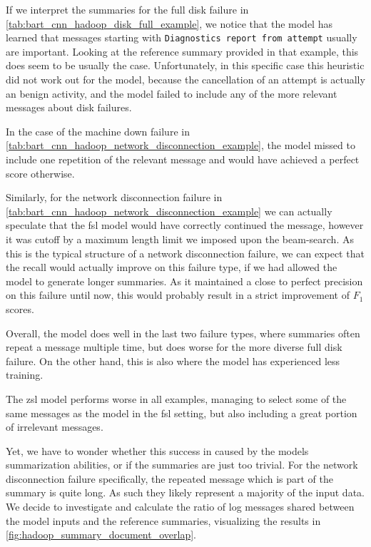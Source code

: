 If we interpret the summaries for the full disk failure in \autoref{tab:bart_cnn_hadoop_disk_full_example},
we notice that the model has learned that messages starting with \verb+Diagnostics report from attempt+ usually are important.
Looking at the reference summary provided in that example, this does seem to be usually the case.
Unfortunately, in this specific case this heuristic did not work out for the model,
because the cancellation of an attempt is actually an benign activity,
and the model failed to include any of the more relevant messages about disk failures.

In the case of the machine down failure in \autoref{tab:bart_cnn_hadoop_network_disconnection_example},
the model missed to include one repetition of the relevant message and would have achieved a perfect score otherwise.

Similarly, for the network disconnection failure in \autoref{tab:bart_cnn_hadoop_network_disconnection_example}
we can actually speculate that the \ac{fsl} model would have correctly continued the message,
however it was cutoff by a maximum length limit we imposed upon the beam-search.
As this is the typical structure of a network disconnection failure,
we can expect that the recall would actually improve on this failure type,
if we had allowed the model to generate longer summaries.
As it maintained a close to perfect precision on this failure until now,
this would probably result in a strict improvement of \(F_1\) scores.

Overall, the model does well in the last two failure types,
where summaries often repeat a message multiple time,
but does worse for the more diverse full disk failure.
On the other hand, this is also where the model has experienced less training.

The \ac{zsl} model performs worse in all examples,
managing to select some of the same messages as the model in the \ac{fsl} setting,
but also including a great portion of irrelevant messages.

Yet, we have to wonder whether this success in caused by the models summarization abilities,
or if the summaries are just too trivial. For the network disconnection failure specifically,
the repeated message which is part of the summary is quite long.
As such they likely represent a majority of the input data.\\
We decide to investigate and calculate the ratio of log messages shared between the model inputs and the reference summaries,
visualizing the results in \autoref{fig:hadoop_summary_document_overlap}.

